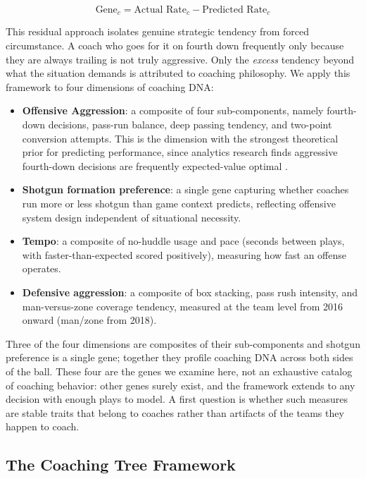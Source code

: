 \documentclass[USenglish]{article}
\theoremstyle{dgthm}
\theoremstyle{dgdef}
\begin{document}
\begin{equation}
\text{Gene}_c = \text{Actual Rate}_c - \text{Predicted Rate}_c
\end{equation}

This residual approach isolates genuine strategic tendency from forced circumstance. A coach who goes for it on fourth down frequently only because they are always trailing is not truly aggressive. Only the \emph{excess} tendency beyond what the situation demands is attributed to coaching philosophy. We apply this framework to four dimensions of coaching DNA:

\begin{itemize}
\item \textbf{Offensive Aggression}: a composite of four sub-components, namely fourth-down decisions, pass-run balance, deep passing tendency, and two-point conversion attempts. This is the dimension with the strongest theoretical prior for predicting performance, since analytics research finds aggressive fourth-down decisions are frequently expected-value optimal \citep{romer2006,burke2009}.
\item \textbf{Shotgun formation preference}: a single gene capturing whether coaches run more or less shotgun than game context predicts, reflecting offensive system design independent of situational necessity.
\item \textbf{Tempo}: a composite of no-huddle usage and pace (seconds between plays, with faster-than-expected scored positively), measuring how fast an offense operates.
\item \textbf{Defensive aggression}: a composite of box stacking, pass rush intensity, and man-versus-zone coverage tendency, measured at the team level from 2016 onward (man/zone from 2018).
\end{itemize}
Three of the four dimensions are composites of their sub-components and shotgun preference is a single gene; together they profile coaching DNA across both sides of the ball. These four are the genes we examine here, not an exhaustive catalog of coaching behavior: other genes surely exist, and the framework extends to any decision with enough plays to model. A first question is whether such measures are stable traits that belong to coaches rather than artifacts of the teams they happen to coach.

\subsection{The Coaching Tree Framework}
\end{document}
